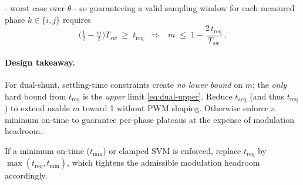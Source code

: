 \documentclass[conference]{IEEEtran}
\begin{document}
- worst case over $\theta$ - so guaranteeing a valid sampling window for each measured phase \(k\in\{i,j\}\) requires
\begin{equation}
\Big(\tfrac{1}{2}-\tfrac{m}{2}\Big)T_{sw} \;\ge\; t_{\mathrm{req}}
\;\;\Longrightarrow\;\;
\boxed{~ m \;\le\; 1 - \frac{2\,t_{\mathrm{req}}}{T_{sw}} ~}.
\label{eq:dual-upper}
\end{equation}

\paragraph*{Design takeaway.}
For dual-shunt, settling-time constraints create \emph{no lower bound} on \(m\); the \emph{only} hard bound from \(t_{\mathrm{req}}\) is the \emph{upper} limit \eqref{eq:dual-upper}. Reduce \(t_{\mathrm{acq}}\) (and thus \(t_{\mathrm{req}}\)) to extend usable \(m\) toward 1 without PWM shaping. Otherwise enforce a minimum on-time to guarantee per-phase plateaus at the expense of modulation headroom\cite{ACTAszucs_implementation_2025}.

If a minimum on-time ($t_{\min}$) or clamped SVM is enforced, replace $t_{\mathrm{req}}$ by $\max(t_{\mathrm{req}},t_{\min})$, which tightens the admissible modulation headroom accordingly.
\end{document}
